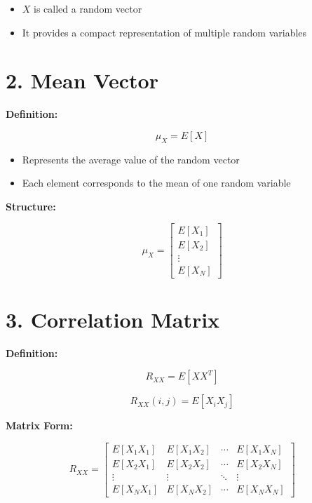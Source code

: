 ﻿\documentclass[12pt]{article}
\begin{document}
\begin{itemize}
\item $X$ is called a random vector
\item It provides a compact representation of multiple random variables
\end{itemize}




\section*{2. Mean Vector}


\vspace{0.2cm}


\textbf{Definition:}


\[
\mu_X = E[X]
\]


\begin{itemize}
\item Represents the average value of the random vector
\item Each element corresponds to the mean of one random variable
\end{itemize}


\textbf{Structure:}


\[
\mu_X =
\begin{bmatrix}
E[X_1] \\
E[X_2] \\
\vdots \\
E[X_N]
\end{bmatrix}
\]




\section*{3. Correlation Matrix}


\vspace{0.2cm}


\textbf{Definition:}


\[
R_{XX} = E[XX^T]
\]


\[
R_{XX}(i,j) = E[X_i X_j]
\]


\textbf{Matrix Form:}


\[
R_{XX} =
\begin{bmatrix}
E[X_1X_1] & E[X_1X_2] & \cdots & E[X_1X_N] \\
E[X_2X_1] & E[X_2X_2] & \cdots & E[X_2X_N] \\
\vdots & \vdots & \ddots & \vdots \\
E[X_NX_1] & E[X_NX_2] & \cdots & E[X_NX_N]
\end{bmatrix}
\]
\end{document}
